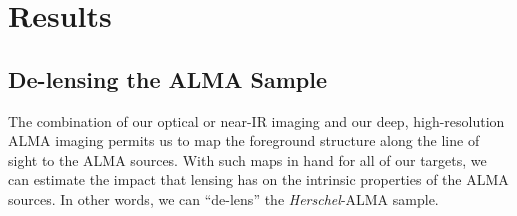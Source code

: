 \documentclass[iop]{emulateapj}
\begin{document}
%
%

%
%


\section{Results}\label{sec:results}

\subsection{De-lensing the ALMA Sample}\label{sec:lensing}

The combination of our optical or near-IR imaging and our deep, high-resolution
ALMA imaging permits us to map the foreground structure along the line of sight
to the ALMA sources.  With such maps in hand for all of our targets, we can
estimate the impact that lensing has on the intrinsic properties of the ALMA
sources.  In other words, we can ``de-lens'' the {\it Herschel}-ALMA sample.
\end{document}
